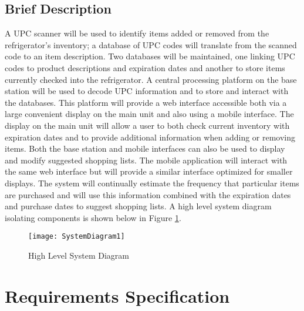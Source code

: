 \documentclass[11pt,letterpaper]{article}
\begin{document}
\subsection{Brief Description}
A UPC scanner will be used to identify items added or removed from the refrigerator's inventory; a database of UPC codes will translate from the scanned code to an item description. Two databases will be maintained, one linking UPC codes to product descriptions and expiration dates and another to store items currently checked into the refrigerator. A central processing platform on the base station will be used to decode UPC information and to store and interact with the databases. This platform will provide a web interface accessible both via a large convenient display on the main unit and also using a mobile interface. The display on the main unit will allow a user to both check current inventory with expiration dates and to provide additional information when adding or removing items. Both the base station and mobile interfaces can also be used to display and modify suggested shopping lists. The mobile application will interact with the same web interface but will provide a similar interface optimized for smaller displays. The system will continually estimate the frequency that particular items are purchased and will use this information combined with the expiration dates and purchase dates to suggest shopping lists.
\newline \quad \newline
A high level system diagram isolating components is shown below in Figure \ref{fig:sysdiag}.
\begin{figure}[h!]
\begin{center}
\texttt{[image: SystemDiagram1]}
\end{center}
\caption{High Level System Diagram}
\label{fig:sysdiag}
\end{figure}
\pagebreak
\section{Requirements Specification}
\end{document}
